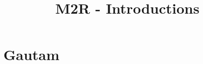 \documentclass{article}
\title{M2R - Introductions}
\begin{document}
\maketitle

\section{Gautam}
\label{sec:1}



\clearpage
\printbibliography
\end{document}
